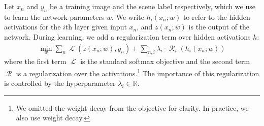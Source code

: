 \documentclass[10pt,journal,compsoc]{IEEEtran}
\DeclareMathOperator{\cL}{\mathcal{L}}
\DeclareMathOperator{\cR}{\mathcal{R}}
\begin{document}
    Let $x_n$ and $y_n$ be a training image and the scene label respectively, which we use to learn the network parameters $w$. We write $h_i(x_n; w)$ to refer to the hidden activations for the $i$th layer given input $x_n$, and $z(x_n; w)$ is the output of the network. During learning, we add a regularization term over hidden activations $h$:
    \begin{align}
        \min_w \sum_{n} \cL(z(x_n; w), y_n) +  \sum_{n, i} \lambda_i \cdot \cR_i\left(h_i(x_n; w)\right)
        \label{eqn:reg}
    \end{align}
    where the first term $\cL$ is the standard softmax objective and the second term $\cR$ is a regularization over the activations.\footnote{We omitted the weight decay from the objective for clarity. In practice, we also use weight decay.} The importance of this regularization is controlled by the hyperparameter $\lambda_i \in \mathbb{R}$.
    
    
\end{document}
